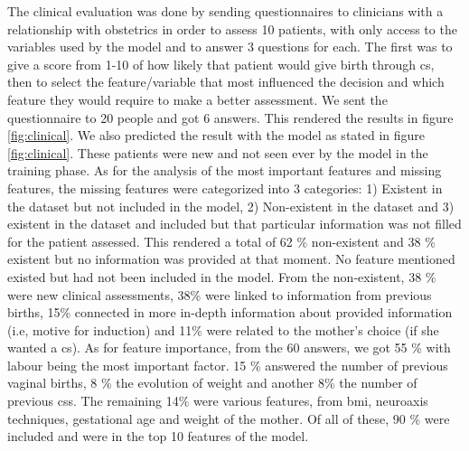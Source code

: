 The clinical evaluation was done by sending questionnaires to clinicians with a relationship with obstetrics in order to assess 10 patients, with only access to the variables used by the model and to answer 3 questions for each. The first was to give a score from 1-10 of how likely that patient would give birth through \ac{cs}, then to select the feature/variable that most influenced the decision and which feature they would require to make a better assessment. We sent the questionnaire to 20 people and got 6 answers. This rendered the results in figure \ref{fig:clinical}. We also predicted the result with the model as stated in figure \ref{fig:clinical}. These patients were new and not seen ever by the model in the training phase. 
As for the analysis of the most important features and missing features, the missing features were categorized into 3 categories: 1) Existent in the dataset but not included in the model, 2) Non-existent in the dataset and 3) existent in the dataset and included but that particular information was not filled for the patient assessed. This rendered a total of 62 \% non-existent and 38 \% existent but no information was provided at that moment. No feature mentioned existed but had not been included in the model. From the non-existent, 38 \% were new clinical assessments, 38\% were linked to information from previous births,  15\% connected in more in-depth information about provided information (i.e, motive for induction) and 11\% were related to the mother's choice (if she wanted a \ac{cs}).
As for feature importance, from the 60 answers, we got 55 \% with labour being the most important factor. 15 \% answered the number of previous vaginal births, 8 \% the evolution of weight and another 8\% the number of previous \acp{cs}. The remaining 14\% were various features, from \ac{bmi}, neuroaxis techniques, gestational age and weight of the mother. Of all of these, 90 \% were included and were in the top 10 features of the model.




